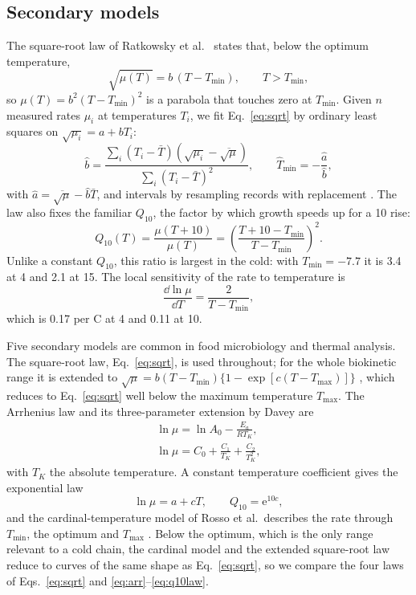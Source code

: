 \subsection{Secondary models}\label{sec:secondary}
The square-root law of Ratkowsky et al.\ \cite{ratkowsky1982} states that, below the optimum temperature,
\begin{equation}\label{eq:sqrt}
\sqrt{\mu(T)} = b\,(T - T_{\min}), \qquad T > T_{\min},
\end{equation}
so $\mu(T)=b^2(T-T_{\min})^2$ is a parabola that touches zero at $T_{\min}$. Given $n$ measured rates $\mu_i$ at temperatures $T_i$, we fit Eq.~\eqref{eq:sqrt} by ordinary least squares on $\sqrt{\mu_i}=a+bT_i$:
\begin{equation}\label{eq:ols}
\hat b=\frac{\sum_i (T_i-\bar T)(\sqrt{\mu_i}-\overline{\sqrt{\mu}})}{\sum_i (T_i-\bar T)^2},\qquad \hat T_{\min}=-\frac{\hat a}{\hat b},
\end{equation}
with $\hat a=\overline{\sqrt{\mu}}-\hat b\bar T$, and intervals by resampling records with replacement \cite{efron1993}. The law also fixes the familiar $Q_{10}$, the factor by which growth speeds up for a 10\degC{} rise:
\begin{equation}\label{eq:q10}
Q_{10}(T)=\frac{\mu(T+10)}{\mu(T)}=\left(\frac{T+10-T_{\min}}{T-T_{\min}}\right)^{2}.
\end{equation}
Unlike a constant $Q_{10}$, this ratio is largest in the cold: with $T_{\min}=-7.7$\degC{} \cite{neumeyer1995} it is 3.4 at 4\degC{} and 2.1 at 15\degC. The local sensitivity of the rate to temperature is
\begin{equation}\label{eq:sens}
\frac{\dd\ln\mu}{\dd T}=\frac{2}{T-T_{\min}},
\end{equation}
which is 0.17 per \textdegree C at 4\degC{} and 0.11 at 10\degC.


Five secondary models are common in food microbiology and thermal analysis. The square-root law, Eq.~\eqref{eq:sqrt}, is used throughout; for the whole biokinetic range it is extended to $\sqrt{\mu}=b(T-T_{\min})\{1-\exp[c(T-T_{\max})]\}$ \cite{ratkowsky1982}, which reduces to Eq.~\eqref{eq:sqrt} well below the maximum temperature $T_{\max}$. The Arrhenius law and its three-parameter extension by Davey are
\begin{gather}
\ln\mu=\ln A_0-\frac{E_a}{RT_K},\label{eq:arr}\\
\ln\mu=C_0+\frac{C_1}{T_K}+\frac{C_2}{T_K^2},\label{eq:davey}
\end{gather}
with $T_K$ the absolute temperature. A constant temperature coefficient gives the exponential law
\begin{equation}\label{eq:q10law}
\ln\mu=a+cT,\qquad Q_{10}=\mathrm{e}^{10c},
\end{equation}
and the cardinal-temperature model of Rosso et al.\ describes the rate through $T_{\min}$, the optimum and $T_{\max}$ \cite{rosso1993}. Below the optimum, which is the only range relevant to a cold chain, the cardinal model and the extended square-root law reduce to curves of the same shape as Eq.~\eqref{eq:sqrt}, so we compare the four laws of Eqs.~\eqref{eq:sqrt} and \eqref{eq:arr}--\eqref{eq:q10law}.

